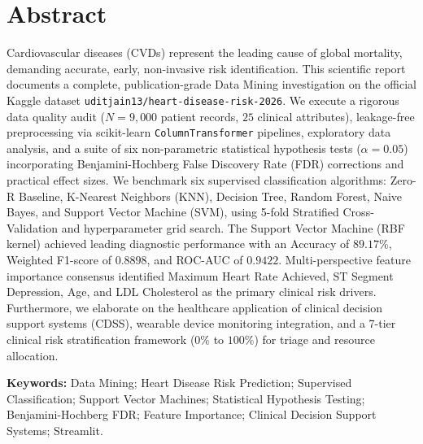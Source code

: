 \documentclass[11pt,a4paper,oneside]{report}
\begin{document}
\vspace{2em}

\section*{Abstract}
\noindent Cardiovascular diseases (CVDs) represent the leading cause of global mortality, demanding accurate, early, non-invasive risk identification. This scientific report documents a complete, publication-grade Data Mining investigation on the official Kaggle dataset \texttt{uditjain13/heart-disease-risk-2026}. We execute a rigorous data quality audit ($N = 9,000$ patient records, $25$ clinical attributes), leakage-free preprocessing via scikit-learn \texttt{ColumnTransformer} pipelines, exploratory data analysis, and a suite of six non-parametric statistical hypothesis tests ($\alpha = 0.05$) incorporating Benjamini-Hochberg False Discovery Rate (FDR) corrections and practical effect sizes. We benchmark six supervised classification algorithms: Zero-R Baseline, K-Nearest Neighbors (KNN), Decision Tree, Random Forest, Naive Bayes, and Support Vector Machine (SVM), using 5-fold Stratified Cross-Validation and hyperparameter grid search. The Support Vector Machine (RBF kernel) achieved leading diagnostic performance with an Accuracy of $89.17\%$, Weighted F1-score of $0.8898$, and ROC-AUC of $0.9422$. Multi-perspective feature importance consensus identified Maximum Heart Rate Achieved, ST Segment Depression, Age, and LDL Cholesterol as the primary clinical risk drivers. Furthermore, we elaborate on the healthcare application of clinical decision support systems (CDSS), wearable device monitoring integration, and a 7-tier clinical risk stratification framework ($0\%$ to $100\%$) for triage and resource allocation.

\vspace{1.5em}
\noindent \textbf{Keywords:} Data Mining; Heart Disease Risk Prediction; Supervised Classification; Support Vector Machines; Statistical Hypothesis Testing; Benjamini-Hochberg FDR; Feature Importance; Clinical Decision Support Systems; Streamlit.

\newpage
\tableofcontents
\newpage
\listoffigures
\newpage
\listoftables
\newpage
\end{document}
